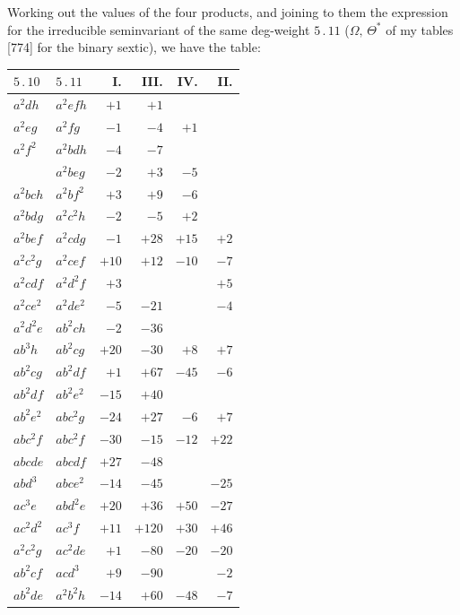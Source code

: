 \documentclass[11pt]{article}
\begin{document}
\medskip
Working out the values of the four products, and joining to them the expression
for the irreducible seminvariant of the same deg-weight $5\,.\,11$ ($\Omega,\,\Theta^{*}$ of my tables [774]
for the binary sextic), we have the table:

\medskip
\begin{center}
\begin{tabular}{|l|l|r|r|r|r|}
\hline
$5\,.\,10$ & $5\,.\,11$ & I. & III. & IV. & II.\\
\hline
$a^{2}dh$ & $a^{2}efh$ & $+1$ & $+1$ & & \\
$a^{2}eg$ & $a^{2}fg$ & $-1$ & $-4$ & $+1$ & \\
$a^{2}f^{2}$ & $a^{2}bdh$ & $-4$ & $-7$ & & \\
& $a^{2}beg$ & $-2$ & $+3$ & $-5$ & \\
$a^{2}bch$ & $a^{2}bf^{2}$ & $+3$ & $+9$ & $-6$ & \\
$a^{2}bdg$ & $a^{2}c^{2}h$ & $-2$ & $-5$ & $+2$ & \\
$a^{2}bef$ & $a^{2}cdg$ & $-1$ & $+28$ & $+15$ & $+2$\\
$a^{2}c^{2}g$ & $a^{2}cef$ & $+10$ & $+12$ & $-10$ & $-7$\\
$a^{2}cdf$ & $a^{2}d^{2}f$ & $+3$ & & & $+5$\\
$a^{2}ce^{2}$ & $a^{2}de^{2}$ & $-5$ & $-21$ & & $-4$\\
$a^{2}d^{2}e$ & $ab^{2}ch$ & $-2$ & $-36$ & & \\
$ab^{3}h$ & $ab^{2}cg$ & $+20$ & $-30$ & $+8$ & $+7$\\
$ab^{2}cg$ & $ab^{2}df$ & $+1$ & $+67$ & $-45$ & $-6$\\
$ab^{2}df$ & $ab^{2}e^{2}$ & $-15$ & $+40$ & & \\
$ab^{2}e^{2}$ & $abc^{2}g$ & $-24$ & $+27$ & $-6$ & $+7$\\
$abc^{2}f$ & $abc^{2}f$ & $-30$ & $-15$ & $-12$ & $+22$\\
$abcde$ & $abcdf$ & $+27$ & $-48$ & & \\
$abd^{3}$ & $abce^{2}$ & $-14$ & $-45$ & & $-25$\\
$ac^{3}e$ & $abd^{2}e$ & $+20$ & $+36$ & $+50$ & $-27$\\
$ac^{2}d^{2}$ & $ac^{3}f$ & $+11$ & $+120$ & $+30$ & $+46$\\
$a^{2}c^{2}g$ & $ac^{2}de$ & $+1$ & $-80$ & $-20$ & $-20$\\
$ab^{2}cf$ & $ac d^{3}$ & $+9$ & $-90$ & & $-2$\\
$ab^{2}de$ & $a^{2}b^{2}h$ & $-14$ & $+60$ & $-48$ & $-7$\\

\end{tabular}
\end{center}
\end{document}
